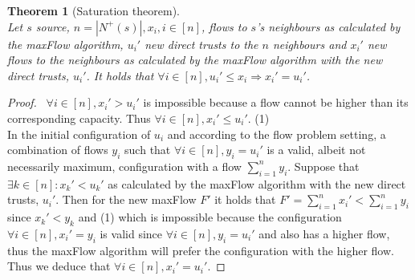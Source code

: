 \documentclass[11pt]{article}
\newtheorem{theorem}{Theorem}[section]
\theoremstyle{definition}
\theoremstyle{corollary}
\theoremstyle{lemma}
\begin{document}
    \begin{theorem}[Saturation theorem] \ \\ 
       \label{saturation}
       Let $s$ source, $n = |N^{+}(s)|, x_i, i \in [n]$, flows to $s$'s neighbours as calculated by the
       maxFlow algorithm, $u_i'$ new direct trusts to the $n$ neighbours and $x_i'$ new flows to the neighbours
       as calculated by the maxFlow algorithm with the new direct trusts, $u_i'$. It holds that
       $\forall i \in [n], u_i' \leq x_i \Rightarrow x_i' = u_i'$.
    \end{theorem}
    \begin{proof} \ 
       $\forall i \in [n], x_i' > u_i'$ is impossible because a flow cannot be higher than its
       corresponding capacity. Thus $\forall i \in [n], x_i' \leq u_i'$. (1) \\
       In the initial configuration of $u_i$ and according to the flow problem setting, a combination of flows
       $y_i$ such that $\forall i \in [n], y_i = u_i'$ is a valid, albeit not necessarily maximum,
       configuration with a flow $\sum\limits_{i=1}^{n}y_i$. Suppose that $\exists k \in [n] : x_k'
       < u_k'$ as calculated by the maxFlow algorithm with the new direct trusts, $u_i'$. Then for the new
       maxFlow $F'$ it holds that $F' = \sum\limits_{i=1}^{n}x_i' < \sum\limits_{i=1}^{n}y_i$ since $x_k' < y_k$
       and (1) which is impossible because the configuration $\forall i \in [n], x_i' = y_i$ is valid since 
       $\forall i \in [n], y_i = u_i'$ and also has a higher flow, thus the maxFlow algorithm will
       prefer the configuration with the higher flow. Thus we deduce that $\forall i \in [n], x_i' = u_i'$.
    \end{proof}
\end{document}
